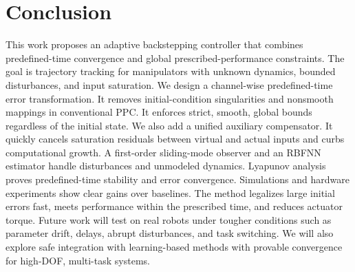 \documentclass[pdflatex,sn-mathphys-num]{sn-jnl}%
\theoremstyle{thmstyleone}%
\theoremstyle{thmstyletwo}%
\theoremstyle{thmstylethree}%
\begin{document}
	

\section{Conclusion}



This work proposes an adaptive backstepping controller that combines predefined-time convergence and global prescribed-performance constraints. The goal is trajectory tracking for manipulators with unknown dynamics, bounded disturbances, and input saturation. We design a channel-wise predefined-time error transformation. It removes initial-condition singularities and nonsmooth mappings in conventional PPC. It enforces strict, smooth, global bounds regardless of the initial state. We also add a unified auxiliary compensator. It quickly cancels saturation residuals between virtual and actual inputs and curbs computational growth. A first-order sliding-mode observer and an RBFNN estimator handle disturbances and unmodeled dynamics. Lyapunov analysis proves predefined-time stability and error convergence. Simulations and hardware experiments show clear gains over baselines. The method legalizes large initial errors fast, meets performance within the prescribed time, and reduces actuator torque. Future work will test on real robots under tougher conditions such as parameter drift, delays, abrupt disturbances, and task switching. We will also explore safe integration with learning-based methods with provable convergence for high-DOF, multi-task systems.
\end{document}
